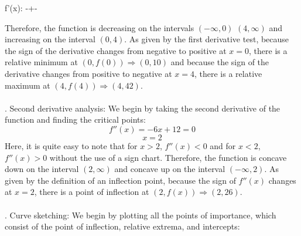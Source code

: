 \documentclass[11pt]{scrartcl}
\begin{document}
\def\sgchartD#1#2,{\ifx\relax#1\else\hbox to\tcolw{\hss$#1#2$\hss}\expandafter\sgchartD\fi}
\def\sgchartE#1#2,{\ifx\relax#1\else
    \ifx~#1\sgchartS\tcolw\circ \else\sgchartS\tcolw\bullet\fi \expandafter\sgchartE\fi}
\def\sgchartR{\leaders\vrule height2.8pt depth-2.4pt\hfil}
\def\sgchartS#1#2{\hbox to#1{\kern-.2pt\sgchartR \ifx\relax#2\else
   \kern-.7pt$#2$\kern-.7pt\sgchartR\fi\kern-.2pt}}
\ecatcode
\begin{center}
  {f'(x): -+-}
\end{center}
\noindent 
Therefore, the function is decreasing on the intervals $(-\infty, 0)$  $(4, \infty)$ and increasing on the interval $(0,4)$. As given by the first derivative test, because the sign of the derivative changes from negative to positive at $x=0$, there is a relative minimum at $(0,f(0)) \Rightarrow (0,10)$ and because the sign of the derivative changes from positive to negative at $x=4$, there is a relative maximum at $(4, f(4)) \Rightarrow (4, 42)$. \\
\\
. Second derivative analysis: We begin by taking the second derivative of the function and finding the critical points: 
$$f''(x)=-6x+12=0$$
$$x=2$$
\noindent 
Here, it is quite easy to note that for $x>2$, $f''(x)<0$ and for $x<2$, $f''(x)>0$ without the use of a sign chart. Therefore, the function is concave down on the interval $(2, \infty)$ and concave up on the interval $(-\infty, 2)$. As given by the definition of an inflection point, because the sign of $f''(x)$ changes at $x=2$, there is a point of inflection at $(2, f(x)) \Rightarrow (2, 26)$. \\
\\
. Curve sketching: We begin by plotting all the points of importance, which consist of the point of inflection, relative extrema, and intercepts: 
\end{document}

